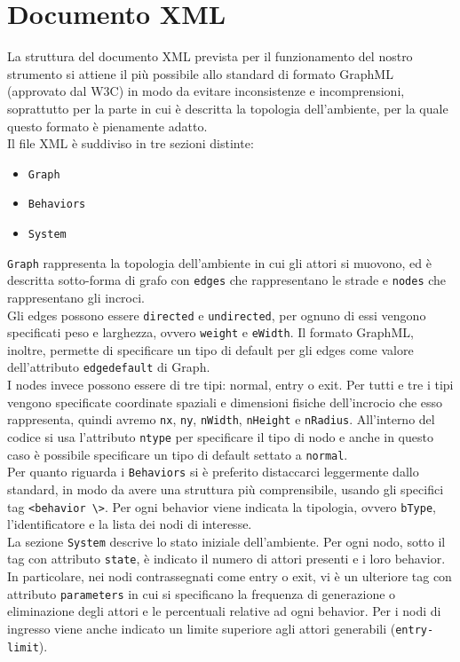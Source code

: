 \section{Documento XML}
La struttura del documento XML prevista per il funzionamento del nostro strumento si attiene il più possibile allo standard di formato GraphML \cite{graphml} (approvato dal W3C) in modo da evitare inconsistenze e incomprensioni, soprattutto per la parte in cui è descritta la topologia dell'ambiente, per la quale questo formato è pienamente adatto.\\
Il file XML è suddiviso in tre sezioni distinte:
\begin{itemize}
\item \texttt{Graph}
\item \texttt{Behaviors}
\item \texttt{System}
\end{itemize} 
\texttt{Graph} rappresenta la topologia dell'ambiente in cui gli attori si muovono, ed è descritta sotto-forma di grafo con \texttt{edges} che rappresentano le strade e \texttt{nodes} che rappresentano gli incroci.\\
Gli edges possono essere \texttt{directed} e \texttt{undirected}, per ognuno di essi vengono specificati peso e larghezza, ovvero \texttt{weight} e \texttt{eWidth}. Il formato GraphML, inoltre, permette di specificare un tipo di default per gli edges come valore dell'attributo \texttt{edgedefault} di Graph.\\
I nodes invece possono essere di tre tipi: normal, entry o exit. Per tutti e tre i tipi vengono specificate coordinate spaziali e dimensioni fisiche dell'incrocio che esso rappresenta, quindi avremo \texttt{nx}, \texttt{ny}, \texttt{nWidth}, \texttt{nHeight} e \texttt{nRadius}. All'interno del codice si usa l'attributo \texttt{ntype} per specificare il tipo di nodo e anche in questo caso è possibile specificare un tipo di default settato a \texttt{normal}.\\
Per quanto riguarda i \texttt{Behaviors} si è preferito distaccarci leggermente dallo standard, in modo da avere una struttura più comprensibile, usando gli specifici tag \texttt{<behavior \textbackslash>}. Per ogni behavior viene indicata la tipologia, ovvero \texttt{bType}, l'identificatore e la lista dei nodi di interesse.\\
La sezione \texttt{System} descrive lo stato iniziale dell'ambiente. Per ogni nodo, sotto il tag con attributo \texttt{state}, è indicato il numero di attori presenti e i loro behavior. In particolare, nei nodi contrassegnati come entry o exit, vi è un ulteriore tag con attributo \texttt{parameters} in cui si specificano la frequenza di generazione o eliminazione degli attori e le percentuali relative ad ogni behavior. Per i nodi di ingresso viene anche indicato un limite superiore agli attori generabili (\texttt{entry-limit}).

